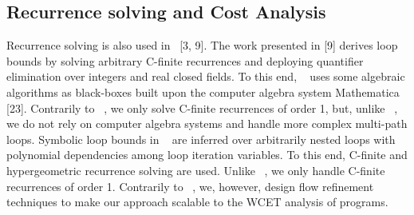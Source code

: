 \subsection{Recurrence solving and Cost Analysis} 
Recurrence solving is also used in~\cite{10.1007/978-3-642-17511-4_7,Henzinger:2008:VVT:1484209.1484240} [3, 9]. The work presented in [9] derives loop bounds by solving arbitrary C-finite recurrences and deploying quantifier elimination over integers and real closed fields. To this end, ~\cite{Henzinger:2008:VVT:1484209.1484240} uses some algebraic algorithms as black-boxes built upon the computer algebra system Mathematica [23]. Contrarily to ~\cite{Henzinger:2008:VVT:1484209.1484240}, we only solve C-finite recurrences of order 1, but, unlike ~\cite{Henzinger:2008:VVT:1484209.1484240}, we do not rely on computer algebra systems and handle more complex multi-path loops. Symbolic loop bounds in ~\cite{10.1007/978-3-642-17511-4_7} are inferred over arbitrarily nested loops with polynomial dependencies among loop iteration variables. To this end, C-ﬁnite and hypergeometric recurrence solving are used. Unlike ~\cite{10.1007/978-3-642-17511-4_7}, we only handle C-ﬁnite recurrences of order 1. Contrarily to ~\cite{10.1007/978-3-642-17511-4_7}, we, however, design ﬂow refinement techniques to make our approach scalable to the WCET analysis of programs.










